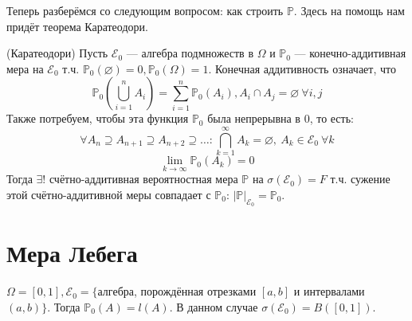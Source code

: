 \documentclass[11pt]{article}
\begin{document}
Теперь разберёмся со следующим вопросом: как строить $\mathbb{P}$. Здесь на помощь нам придёт теорема Каратеодори.

\begin{theorem}
    (Каратеодори) Пусть $\mathcal{E}_0$ --- алгебра подмножеств в $\Omega$ и $\mathbb{P}_0$ --- конечно-аддитивная мера на $\mathcal{E}_0$ т.ч. $\mathbb{P}_0(\varnothing) = 0, \mathbb{P}_0(\Omega) = 1$.
    Конечная аддитивность означает, что 
    \[ \mathbb{P}_0 (\displaystyle \bigcup_{i=1}^n A_i) = \sum _{i=1}^n \mathbb{P}_0 (A_i), A_i \cap A_j =\varnothing \ \forall i,j \]
    Также потребуем, чтобы эта функция $\mathbb{P}_0$ была непрерывна в 0, то есть:
    \[ \forall A_n\supseteq A_{n+1} \supseteq A_{n+2} \supseteq \ldots : \bigcap_{k=1}^\infty A_k = \varnothing, \ A_k\in \mathcal{E}_0 \ \forall k \]
    \[ \lim\limits_{k\to \infty} \mathbb{P}_0(A_k) = 0 \] 
    Тогда $\exists!$ счётно-аддитивная вероятностная мера $\mathbb{P}$ на $\sigma(\mathcal{E}_0) = F$ т.ч. сужение этой счётно-аддитивной меры совпадает с $\mathbb{P}_0$: $| \mathbb{P}|_{\mathcal{E}_0} = \mathbb{P}_0$. 
\end{theorem}


\section{Мера Лебега}

\begin{definition}
    $\Omega = [0,1], \mathcal{E}_0 = \{$алгебра, порождённая отрезками $[a,b]$ и интервалами $(a,b) \}$. Тогда $\mathbb{P}_0 (A) = l(A)$.
    В данном случае $\sigma(\mathcal{E}_0) = B([0,1])$. 
\end{definition}
\end{document}
